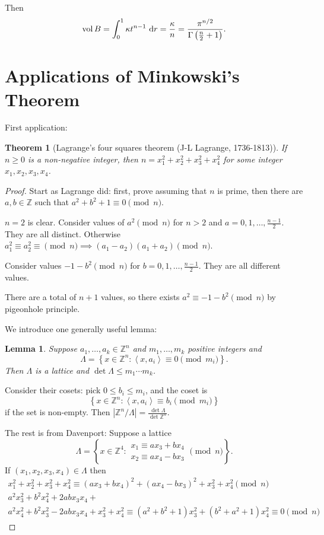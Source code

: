 \documentclass{report}
\newcommand{\Z}{\mathbb{Z}}
\newcommand{\idf}{\ \mathrm{d}}
\newcommand{\inner}[2]{\left\langle #1, #2\right\rangle}
\newcommand{\set}[1]{\left\{ #1 \right\}}
\newtheorem{theorem}{Theorem}[section]
\newtheorem{lemma}{Lemma}[section]
\theoremstyle{definition}
\theoremstyle{remark}
\numberwithin{equation}{section}
\begin{document}
Then \[
    \vol B = \int_0^1 \kappa t^{n-1} \idf r = \frac{\kappa}{n} = \frac{\pi^{n/2}}{\Gamma\left(\frac{n}{2}+1\right)}.
\]

\section{Applications of Minkowski's Theorem}
First application:
\begin{theorem}[Lagrange's four squares theorem (J-L Lagrange, 1736-1813)]
    If $n \geq 0$ is a non-negative integer, then $n = x_1^2 + x_2^2 + x_3^2 + x_4^2$ for some integer $x_1, x_2, x_3, x_4$.
\end{theorem}
\begin{proof}
    Start as Lagrange did: first, prove assuming that $n$ is prime, then there are $a, b \in \Z$ such that $a^2 + b^2 + 1 \equiv 0 \pmod{n}$.

    $n = 2$ is clear. Consider values of $a^2 \pmod{n}$ for $n > 2$ and $a = 0, 1, \ldots, \frac{n-1}{2}$. They are all distinct. Otherwise $a_1^2 \equiv a_2^2 \equiv \pmod{n} \implies (a_1 - a_2)(a_1 + a_2) \pmod{n}$.

    Consider values $-1-b^2 \pmod{n}$ for $b = 0, 1, \ldots, \frac{n-1}{2}$. They are all different values.

    There are a total of $n+1$ values, so there exists $a^2 \equiv -1 - b^2 \pmod{n}$ by pigeonhole principle.

    We introduce one generally useful lemma:
    \begin{lemma}
        Suppose $a_1, \ldots, a_k \in \Z^n$ and $m_1, \ldots, m_k$ positive integers and
        \[\Lambda = \set{x \in \Z^n: \inner{x}{a_i} \equiv 0 \pmod{m_i}}.\]
        Then $\Lambda$ is a lattice and $\det \Lambda \leq m_1\cdots m_k$.
    \end{lemma}
    Consider their cosets: pick $0 \leq b_i \leq m_i$, and the coset is \[\set{x \in \Z^n: \inner{x}{a_i} \equiv b_i \pmod{m_i}}\] if the set is non-empty. Then $|\Z^n / \Lambda| = \frac{\det\Lambda}{\det \Z^n}$.

    The rest is from Davenport:
    Suppose a lattice \[\Lambda = \set{x \in \Z^4: \begin{array}{c} x_1 \equiv ax_3 + bx_4 \\ x_2 \equiv ax_4 - bx_3\end{array} \pmod{n}}.\]
    If $(x_1, x_2, x_3, x_4) \in \Lambda$ then \begin{align*}
        x_1^2 + x_2^2 + x_3^2 + x_4^2 \equiv (ax_3 + bx_4)^2 + (ax_4 - bx_3)^2 + x_3^2 + x_4^2 \pmod{n} \\
        a^2x_3^2 + b^2x_4^2 + 2abx_3x_4 + \\
        a^2x_4^2 + b^2x_3^2 - 2abx_3x_4 + x_3^2 + x_4^2 \equiv (a^2 + b^2 + 1)x_3^2 + (b^2 + a^2 + 1) x_4^2 \equiv 0 \pmod{n}
    \end{align*}


\end{proof}
\end{document}
